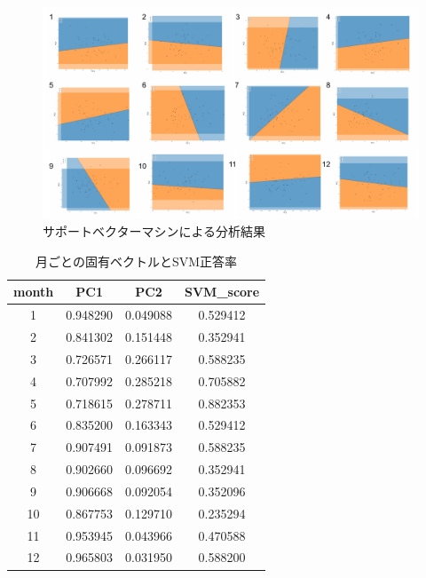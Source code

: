 \documentclass{jarticle}
\begin{document}
\begin{figure}[H]
\centering
\includegraphics[keepaspectratio, scale=0.75]
{svm_plot.pdf}
\caption{サポートベクターマシンによる分析結果}
\label{svm}
\end{figure}

\begin{table}[H]
\caption{月ごとの固有ベクトルとSVM正答率}
\begin{tabular}{|c|c|c|c|} \hline
month&PC1&PC2 &SVM\_score\\ \hline
 1&0.948290&0.049088&0.529412\\ \hline
 2&0.841302&0.151448&0.352941\\ \hline
 3&0.726571&0.266117&0.588235\\ \hline
 4&0.707992 &0.285218&0.705882\\ \hline
 5&0.718615&0.278711&0.882353\\ \hline
 6&0.835200&0.163343&0.529412\\ \hline
 7&0.907491&0.091873&0.588235\\ \hline
 8&0.902660&0.096692&0.352941\\ \hline
 9&0.906668&0.092054&0.352096\\ \hline
 10&0.867753&0.129710&0.235294\\ \hline
 11&0.953945&0.043966&0.470588\\ \hline
 12&0.965803&0.031950&0.588200\\ \hline
\end{tabular}
\centering
\label{score}
\end{table}
\end{document}
